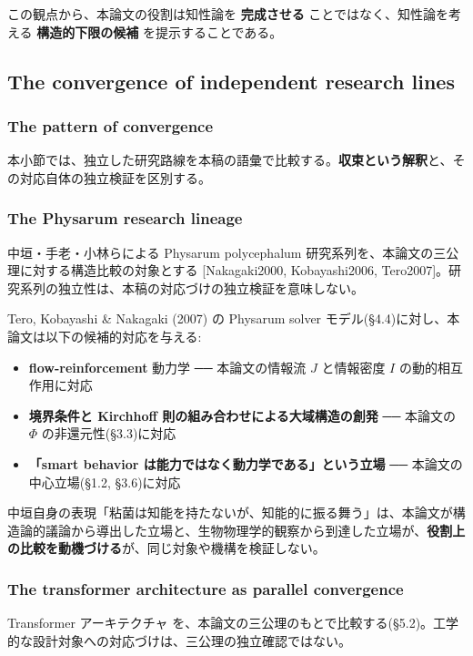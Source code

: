 この観点から、本論文の役割は知性論を \textbf{完成させる} ことではなく、知性論を考える \textbf{構造的下限の候補} を提示することである。

\subsection{The convergence of independent research lines}


\subsubsection{The pattern of convergence}


本小節では、独立した研究路線を本稿の語彙で比較する。\textbf{収束という解釈}と、その対応自体の独立検証を区別する。

\subsubsection{The Physarum research lineage}


中垣・手老・小林らによる Physarum polycephalum 研究系列を、本論文の三公理に対する構造比較の対象とする [Nakagaki2000, Kobayashi2006, Tero2007]。研究系列の独立性は、本稿の対応づけの独立検証を意味しない。

Tero, Kobayashi \& Nakagaki (2007) の Physarum solver モデル(\S{}4.4)に対し、本論文は以下の候補的対応を与える:

\begin{itemize}
\item \textbf{flow-reinforcement} 動力学 ── 本論文の情報流 $J$ と情報密度 $I$ の動的相互作用に対応
\item \textbf{境界条件と Kirchhoff 則の組み合わせによる大域構造の創発} ── 本論文の $\Phi$ の非還元性(\S{}3.3)に対応
\item \textbf{「smart behavior は能力ではなく動力学である」という立場} ── 本論文の中心立場(\S{}1.2, \S{}3.6)に対応
\end{itemize}

中垣自身の表現「粘菌は知能を持たないが、知能的に振る舞う」は、本論文が構造論的議論から導出した立場と、生物物理学的観察から到達した立場が、\textbf{役割上の比較を動機づける}が、同じ対象や機構を検証しない。

\subsubsection{The transformer architecture as parallel convergence}


Transformer アーキテクチャ \citep{Vaswani2017} を、本論文の三公理のもとで比較する(\S{}5.2)。工学的な設計対象への対応づけは、三公理の独立確認ではない。

